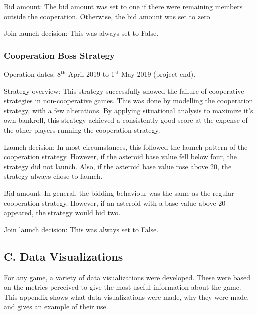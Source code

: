 \documentclass[11pt, twoside]{article}
\begin{document}
Bid amount: The bid amount was set to one if there were remaining members outside the cooperation. Otherwise, the bid amount was set to zero.

Join launch decision: This was always set to False.

\subsubsection*{Cooperation Boss Strategy}
Operation dates: 8$^{\text{th}}$ April 2019 to 1$^{\text{st}}$ May 2019 (project end).

Strategy overview: This strategy successfully showed the failure of cooperative strategies in non-cooperative games. This was done by modelling the cooperation strategy, with a few alterations. By applying situational analysis to maximize it's own bankroll, this strategy achieved a consistently good score at the expense of the other players running the cooperation strategy.

Launch decision: In most circumstances, this followed the launch pattern of the cooperation strategy. However, if the asteroid base value fell below four, the strategy did not launch. Also, if the asteroid base value rose above 20, the strategy always chose to launch.

Bid amount: In general, the bidding behaviour was the same as the regular cooperation strategy. However, if an asteroid with a base value above 20 appeared, the strategy would bid two.

Join launch decision: This was always set to False.


\subsection*{C. Data Visualizations}

For any game, a variety of data visualizations were developed. These were based on the metrics perceived to give the most useful information about the game. This appendix shows what data visualizations were made, why they were made, and gives an example of their use.
\end{document}
